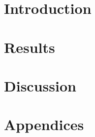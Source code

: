 \documentclass[a4paper,oneside,nobind]{thesis}
\begin{document}


\fancyhf{} %
\pagestyle{fancy}
\renewcommand{\chaptermark}[1]{\markboth{\thechapter. #1}{\thechapter. #1}}
\renewcommand{\sectionmark}[1]{\markright{\thesection. #1}} 
\renewcommand{\headrulewidth}{0pt}
\cfoot{\thepage}
\fancyhead[LO]{\emph{\leftmark}} 
\fancyhead[RE]{\emph{\rightmark}} 

\begin{romanpages}
\dominitoc %
\flushbottom
\tableofcontents
\listoffigures
\mtcaddchapter
\listoftables
\mtcaddchapter
\end{romanpages}

\flushbottom


\part{Introduction}
\label{part:intro}



%
\part{Results}
\label{part:results}

\part{Discussion}
\label{part:discussion}



\cleardoublepage{}
\startappendices
\part*{Appendices}



\end{document}
